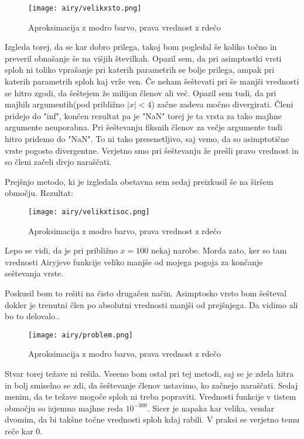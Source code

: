 \documentclass{article}
\begin{document}
\begin{figure}[H]
\texttt{[image: airy/velikxsto.png]}
\caption*{Aproksimacija z modro barvo, prava vrednost z rdečo}
\end{figure}

Izgleda torej, da se kar dobro prilega, takoj bom pogledal še koliko točno in preveril obnašanje še na višjih številkah. Opazil sem, da pri asimptostki vrsti sploh ni toliko vprašanje pri katerih parametrih se bolje prilega, ampak pri katerih parametrih sploh kaj vrže ven. Če neham šeštevati pri še manjši vrednosti se hitro zgodi, da šeštejem že milijon členov ali več. Opazil sem tudi, da pri majhih argumentih(pod približno $|x|<4$) začne zadeva močno divergirati. Členi pridejo do "inf", končen rezultat pa je "NaN" torej je ta vrsta za tako majhne argumente neuporabna.
Pri šeštevanju fiksnih členov za večje argumente tudi hitro pridemo do "NaN". To ni tako presenetljivo, saj vemo, da so asimptotične vrste pogosto divergentne. Verjetno smo pri šeštevanju že prešli pravo vrednost in so členi začeli divjo naraščati.

Prejšnjo metodo, ki je izgledala obetavna sem sedaj preizkusil še na širšem območju. Rezultat:

\begin{figure}[H]
\texttt{[image: airy/velikxtisoc.png]}
\caption*{Aproksimacija z modro barvo, prava vrednost z rdečo}
\end{figure}

Lepo se vidi, da je pri približno $x=100$ nekaj narobe. Morda zato, ker so tam vrednosti Airyjeve funkcije veliko manjše od mojega pogoja za končanje seštevanja vrste.

Poskusil bom to rešiti na čisto drugačen način. Asimptosko vrsto bom šešteval dokler je trenutni člen po absolutni vrednosti manjši od prejšnjega. Da vidimo ali bo to delovalo..

\begin{figure}[H]
\texttt{[image: airy/problem.png]}
\caption*{Aproksimacija z modro barvo, prava vrednost z rdečo}
\end{figure}

Stvar torej težave ni rešila. Vseeno bom ostal pri tej metodi, saj se je zdela hitra in bolj smiselno se zdi, da šeštevanje členov ustavimo, ko začnejo naraščati.
Sedaj menim, da te težave mogoče sploh ni treba popraviti. Vrednosti funkcije v tistem območju so izjemno majhne reda $10^{-300}$. Sicer je napaka kar velika, vendar dvomim, da bi takšne točne vrednosti sploh kdaj rabili. V praksi se verjetno temu reče kar 0.
\end{document}
